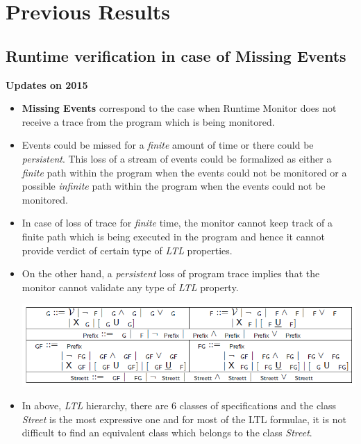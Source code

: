 \documentclass[]{article}
\begin{document}
\section{Previous Results} 

		\subsection{Runtime verification in case of Missing Events}
		\textbf{Updates on  {2015}}\newline
		\begin{itemize}
			
			\item \textbf{Missing Events} correspond to the case when Runtime Monitor does not receive a trace from the program which is being monitored.
			
			\item Events could be missed for a \emph{finite} amount of time or there could be \emph{persistent}. This loss of a stream of events could be formalized as either a \emph{finite} path within the program when the events could not be monitored or a possible \emph{infinite} path within the program when the events could not be monitored.
			
			\item In case of loss of trace for \emph{finite} time, the monitor cannot keep track of a finite path which is being executed in the program and hence it cannot provide verdict of certain type of \emph{LTL} properties.
			
			\item On the other hand, a \emph{persistent} loss of program trace implies that the monitor cannot validate any type of \emph{LTL} property.
			
			\includegraphics[scale=0.4]{LTLHierarchy.png}
			
			\item In above, \emph{LTL} hierarchy, there are 6 classes of specifications and the class \emph{Street} is the most expressive one and for most of the LTL formulae, it is not difficult to find an equivalent class which belongs to the class \emph{Street}.
			

\end{itemize}
\end{document}
